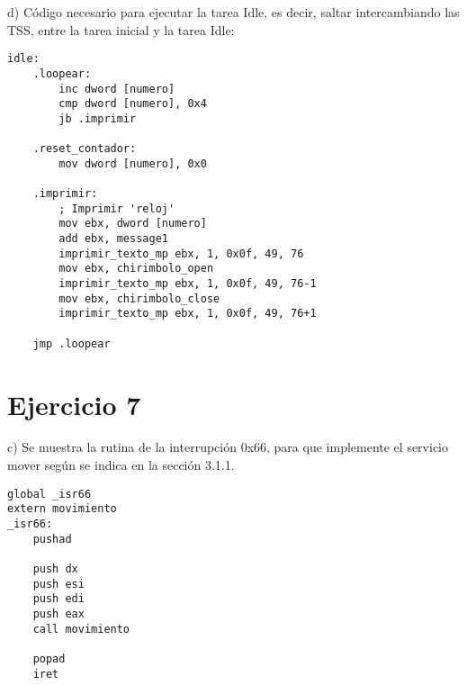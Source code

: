 \documentclass[a4paper]{article}
\begin{document}

{\large d)} C\'odigo necesario para ejecutar la tarea Idle, es decir, saltar intercambiando las
TSS, entre la tarea inicial y la tarea Idle:

\begin{codesnippet}
\begin{verbatim}
idle:
    .loopear:
        inc dword [numero]
        cmp dword [numero], 0x4
        jb .imprimir

    .reset_contador:
        mov dword [numero], 0x0

    .imprimir:
        ; Imprimir 'reloj'
        mov ebx, dword [numero]
        add ebx, message1
        imprimir_texto_mp ebx, 1, 0x0f, 49, 76
        mov ebx, chirimbolo_open
        imprimir_texto_mp ebx, 1, 0x0f, 49, 76-1
        mov ebx, chirimbolo_close
        imprimir_texto_mp ebx, 1, 0x0f, 49, 76+1

    jmp .loopear
\end{verbatim}
\end{codesnippet}

\newpage
\section{Ejercicio 7}





{\large c)} Se muestra la rutina de la interrupci\'on 0x66, para que implemente el servicio mover seg\'un
se indica en la secci\'on 3.1.1.\\

\begin{codesnippet}
\begin{verbatim}
global _isr66
extern movimiento
_isr66:
    pushad
    
    push dx
    push esi
    push edi
    push eax
    call movimiento

    popad
    iret
\end{verbatim}
\end{codesnippet}
\end{document}
